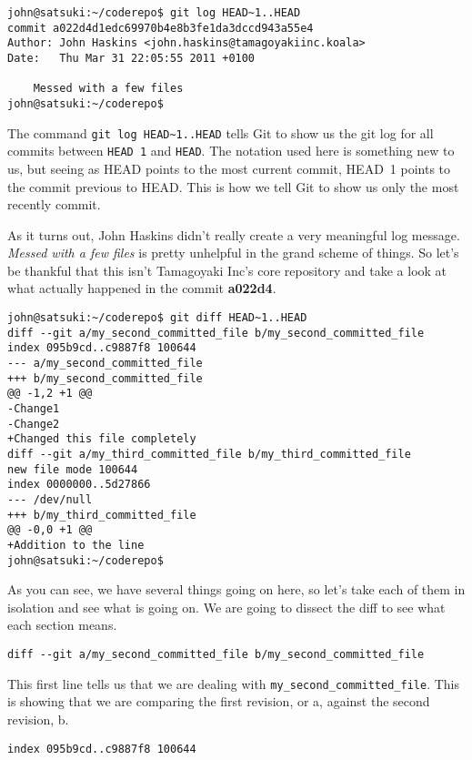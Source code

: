 \begin{Verbatim}
john@satsuki:~/coderepo$ git log HEAD~1..HEAD
commit a022d4d1edc69970b4e8b3fe1da3dccd943a55e4
Author: John Haskins <john.haskins@tamagoyakiinc.koala>
Date:   Thu Mar 31 22:05:55 2011 +0100

    Messed with a few files
john@satsuki:~/coderepo$ 
\end{Verbatim}

The command \texttt{git log HEAD\textasciitilde1..HEAD} tells Git to show us the git log for all commits between \texttt{HEAD~1} and \texttt{HEAD}.  The notation used here is something new to us, but seeing as HEAD points to the most current commit, HEAD~1 points to the commit previous to HEAD.  This is how we tell Git to show us only the most recently commit.  

As it turns out, John Haskins didn't really create a very meaningful log message.  \emph{Messed with a few files} is pretty unhelpful in the grand scheme of things.  So let's be thankful that this isn't Tamagoyaki Inc's core repository and take a look at what actually happened in the commit \textbf{a022d4}.

\begin{Verbatim}
john@satsuki:~/coderepo$ git diff HEAD~1..HEAD
diff --git a/my_second_committed_file b/my_second_committed_file
index 095b9cd..c9887f8 100644
--- a/my_second_committed_file
+++ b/my_second_committed_file
@@ -1,2 +1 @@
-Change1
-Change2
+Changed this file completely
diff --git a/my_third_committed_file b/my_third_committed_file
new file mode 100644
index 0000000..5d27866
--- /dev/null
+++ b/my_third_committed_file
@@ -0,0 +1 @@
+Addition to the line
john@satsuki:~/coderepo$ 
\end{Verbatim}

As you can see, we have several things going on here, so let's take each of them in isolation and see what is going on.  We are going to dissect the diff to see what each section means.

\begin{Verbatim}
diff --git a/my_second_committed_file b/my_second_committed_file
\end{Verbatim}

This first line tells us that we are dealing with \newline\texttt{my\_second\_committed\_file}.  This is showing that we are comparing the first revision, or a, against the second revision, b.

\begin{Verbatim}
index 095b9cd..c9887f8 100644
\end{Verbatim}


